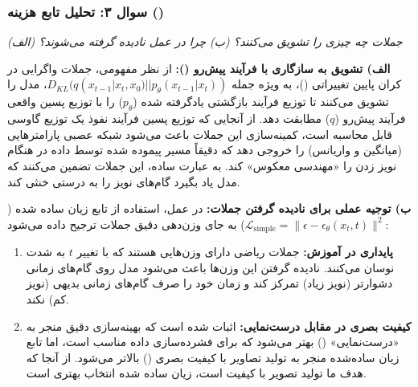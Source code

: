 \subsubsection{سوال ۳: تحلیل تابع هزینه ()}
\textit{(الف) جملات  چه چیزی را تشویق می‌کنند؟ (ب) چرا در عمل نادیده گرفته می‌شوند؟}

\begin{solutionbox}
    \textbf{الف) تشویق به سازگاری با فرآیند پیش‌رو ():}
    از نظر مفهومی، جملات واگرایی  در کران پایین تغییراتی ()، به ویژه جمله $D_{KL}(q(x_{t-1}|x_t, x_0) || p_\theta(x_{t-1}|x_t))$، مدل را تشویق می‌کنند تا توزیع فرآیند بازگشتی یادگرفته شده ($p_\theta$) را با توزیع پسین واقعی فرآیند پیش‌رو ($q$) مطابقت دهد. از آنجایی که توزیع پسین فرآیند نفوذ یک توزیع گاوسی قابل محاسبه است، کمینه‌سازی این جملات باعث می‌شود شبکه عصبی پارامترهایی (میانگین و واریانس) را خروجی دهد که دقیقاً مسیر پیموده شده توسط داده در هنگام نویز زدن را «مهندسی معکوس» کند. به عبارت ساده، این جملات تضمین می‌کنند که مدل یاد بگیرد گام‌های نویز را به درستی خنثی کند.

    

    \textbf{ب) توجیه عملی برای نادیده گرفتن جملات:}
    در عمل، استفاده از تابع زیان ساده شده ($\mathcal{L}_{\text{simple}} = \|\epsilon - \epsilon_\theta(x_t, t)\|^2$) به جای وزن‌دهی دقیق جملات  ترجیح داده می‌شود:
    \begin{enumerate}
        \item \textbf{پایداری در آموزش:} جملات ریاضی  دارای وزن‌هایی هستند که با تغییر $t$ به شدت نوسان می‌کنند. نادیده گرفتن این وزن‌ها باعث می‌شود مدل روی گام‌های زمانی دشوارتر (نویز زیاد) تمرکز کند و زمان خود را صرف گام‌های زمانی بدیهی (نویز کم) نکند.
        \item \textbf{کیفیت بصری در مقابل درست‌نمایی:} اثبات شده است که بهینه‌سازی دقیق  منجر به «درست‌نمایی» () بهتر می‌شود که برای فشرده‌سازی داده مناسب است، اما تابع زیان ساده‌شده منجر به تولید تصاویر با کیفیت بصری () بالاتر می‌شود. از آنجا که هدف ما تولید تصویر با کیفیت است، زیان ساده شده انتخاب بهتری است.
    \end{enumerate}
\end{solutionbox}

